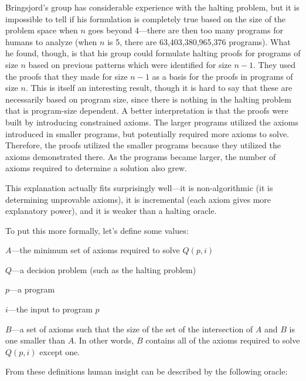 Bringsjord's group has considerable experience with the halting problem, but it is impossible to tell if his formulation is completely true based on the size of the problem space when $n$ goes beyond 4---there are then too many programs for humans to analyze (when $n$ is 5, there are 63,403,380,965,376 programs).  What he found, though, is that his group could formulate halting proofs for programs of size $n$ based on previous patterns which were identified for size $n - 1$.  They used the proofs that they made for size $n - 1$ as a basis for the proofs in programs of size $n$.  This is itself an interesting result, though it is hard to say that these are necessarily based on program size, since there is nothing in the halting problem that is program-size dependent.  A better interpretation is that the proofs were built by introducing constrained axioms.  The larger programs utilized the axioms introduced in smaller programs, but potentially required more axioms to solve.  Therefore, the proofs utilized the smaller programs because they utilized the axioms demonstrated there.  As the programs became larger, the number of axioms required to determine a solution also grew.

This explanation actually fits surprisingly well---it is non-algorithmic (it is determining unprovable axioms), it is incremental (each axiom gives more explanatory power), and it is weaker than a halting oracle.

To put this more formally, let's define some values: 

\begin{description}
\item{$A$}---the minimum set of axioms required to solve $Q(p, i)$

\item{$Q$}---a decision problem (such as the halting problem)

\item{$p$}---a program

\item{$i$}---the input to program $p$

\item{$B$}---a set of axioms such that the size of the set of the intersection of $A$ and $B$ is one smaller than $A$.  In other words, $B$ contains all of the axioms required to solve $Q(p, i)$ except one.
\end{description}

\noindent From these definitions human insight can be described by the following oracle:

